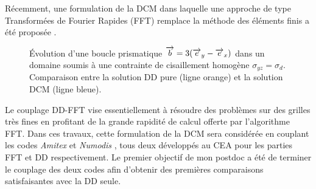 Récemment, une formulation de la DCM dans laquelle une approche de type Transformées de Fourier Rapides (FFT) remplace la méthode des éléments finis a été proposée \cite{bertin2015_fft}.
\begin{figure}[h!]
  \centering
  \caption{{\'E}volution d'une boucle prismatique ${\overrightarrow{b}}=3({\overrightarrow{e}}_y - {\overrightarrow{e}}_x)$ dans un domaine soumis à une contrainte de cisaillement homogène $\sigma_{yz} = \sigma_d$. Comparaison entre la solution DD pure (ligne orange) et la solution DCM (ligne bleue).}
  \label{fig:comparisonDCM}
\end{figure}
Le couplage DD-FFT vise essentiellement à résoudre des problèmes sur des grilles très fines en profitant de la grande rapidité de calcul offerte par l'algorithme FFT.
Dans ces travaux, cette formulation de la DCM sera considérée en couplant les codes \textit{Amitex} \cite{Amitex_FFT} et \textit{Numodis} \cite{Numodis}, tous deux développés au CEA pour les parties FFT et DD respectivement.
Le premier objectif de mon postdoc a été de terminer le couplage des deux codes afin d'obtenir des premières comparaisons satisfaisantes avec la DD seule.


